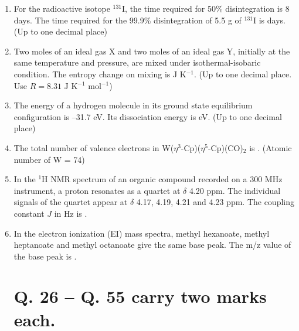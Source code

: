 \documentclass{article}
\begin{document}
\begin{enumerate}
\item For the radioactive isotope $^{131}$I, the time required for 50\% disintegration is 8 days.  
The time required for the 99.9\% disintegration of 5.5 g of $^{131}$I is \underline{\hspace{2cm}} days.  
(Up to one decimal place)

\item Two moles of an ideal gas X and two moles of an ideal gas Y, initially at the same 
temperature and pressure, are mixed under isothermal-isobaric condition. The entropy 
change on mixing is \underline{\hspace{2cm}} J K$^{-1}$. (Up to one decimal place. Use $R = 8.31$ J K$^{-1}$ mol$^{-1}$)

\item The energy of a hydrogen molecule in its ground state equilibrium configuration is –31.7 eV.  
Its dissociation energy is \underline{\hspace{2cm}} eV. (Up to one decimal place)

\item The total number of valence electrons in W($\eta^3$-Cp)($\eta^5$-Cp)(CO)$_2$ is \underline{\hspace{2cm}}.  
(Atomic number of W = 74)

\item In the $^1$H NMR spectrum of an organic compound recorded on a 300 MHz instrument, a 
proton resonates as a quartet at $\delta$ 4.20 ppm. The individual signals of the quartet appear  
at $\delta$ 4.17, 4.19, 4.21 and 4.23 ppm. The coupling constant $J$ in Hz is \underline{\hspace{2cm}}.

\item In the electron ionization (EI) mass spectra, methyl hexanoate, methyl heptanoate and methyl 
octanoate give the same base peak. The m/z value of the base peak is \underline{\hspace{2cm}}.

\section*{Q. 26 – Q. 55 carry two marks each.}


\end{enumerate}
\end{document}
